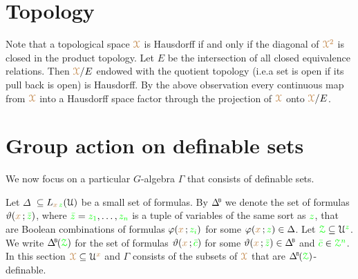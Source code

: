 \section{Topology}

Note that a topological space ${\color{brown}\EuScript X}$ is Hausdorff if and only if the diagonal of ${\color{brown}\EuScript X^2}$ is closed in the product topology.
Let $E$ be the intersection of all closed equivalence relations.
Then ${\color{brown}\EuScript X}/E$ endowed with the quotient topology (i.e.\@ a set is open if its pull back is open) is Hausdorff.
By the above observation every continuous map from ${\color{brown}\EuScript X}$ into a Hausdorff space factor through the projection of ${\color{brown}\EuScript X}$ onto ${\color{brown}\EuScript X}/E$.

\section{Group action on definable sets}\label{action_on_definable_sets}

We now focus on a particular $G$-algebra $\Gamma$ that consists of definable sets.

Let \emph{$\Delta$\/}\ $\subseteq L_{{\color{brown} x}\,{\color{green} z}}(\EuScript U)$ be a small set of formulas.
By \emph{$\BDelta$\/} we denote the set of formulas $\vartheta({\color{brown} x}\,;{\color{green}\bar z})$, where ${\color{green}\bar z}={\color{green} z_1},\dots,{\color{green} z_n}$ is a tuple of variables of the same sort as ${\color{green} z}$, that are Boolean combinations of formulas $\varphi({\color{brown} x}\,;{\color{green} z_i})$ for some $\varphi({\color{brown} x}\,;{\color{green} z})\in\Delta$.
Let ${\color{green}\EuScript Z}\subseteq\EuScript U^{\color{green} z}$.
We write $\BDelta(\grZ)$ for the set of formulas $\vartheta({\color{brown} x}\,;{\color{green}\bar c})$ for some $\theta({\mr x}\,;{\gr\bar z})\in\BDelta$ and ${\color{green}\bar c}\in{\color{green}\EuScript Z^n}$.
In this section ${\color{brown}\EuScript X}\subseteq\EuScript U^{\color{brown} x}$ and \emph{$\Gamma$\/} consists of the subsets of ${\color{brown}\EuScript X}$ that are $\BDelta(\grZ)$-definable.


